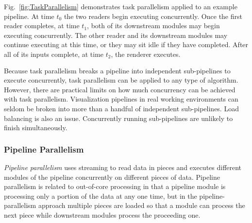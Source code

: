 \documentclass[journal,onecolumn,12pt,letterpaper,twoside]{IEEEtran}
\newcommand*{\figref}[1]{Fig.~\ref{#1}}
\newcommand*{\keyterm}[1]{\emph{#1}}
\begin{document}
\figref{fig:TaskParallelism} demonstrates task parallelism applied to
an example pipeline.  At time $t_0$ the two readers begin executing
concurrently.  Once the first reader completes, at time $t_1$, both of its
downstream modules may begin executing concurrently.  The other reader
and its downstream modules may continue executing at this time, or they
may sit idle if they have completed.  After all of its inputs complete, at
time $t_2$, the renderer executes.

Because task parallelism breaks a pipeline into independent sub-pipelines
to execute concurrently, task parallelism can be applied to any type of
algorithm.  However, there are practical limits on how much concurrency
can be achieved with task parallelism.  Visualization pipelines in real
working environments can seldom be broken into more than a handful of
independent sub-pipelines.  Load balancing is also an issue.  Concurrently
running sub-pipelines are unlikely to finish simultaneously.

\subsubsection{Pipeline Parallelism}
\label{sec:PipelineParallelism}

\keyterm{Pipeline parallelism} uses streaming to read data in pieces and
executes different modules of the pipeline concurrently on different
pieces of data.  Pipeline parallelism is related to out-of-core processing
in that a pipeline module is processing only a portion of the data at
any one time, but in the pipeline-parallelism approach multiple pieces are
loaded so that a module can process the next piece while downstream
modules process the proceeding one.
\end{document}
